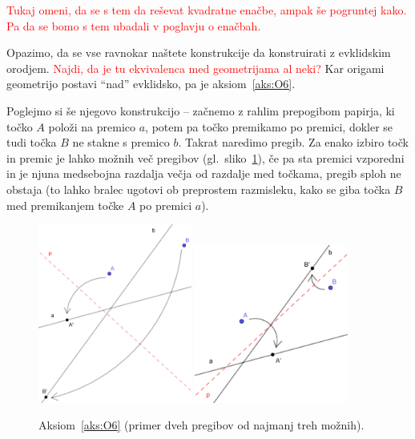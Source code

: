 \textcolor{red}{Tukaj omeni, da se s tem da reševat kvadratne enačbe, ampak še pogruntej kako. Pa da se bomo s tem ubadali v poglavju o enačbah.}

Opazimo, da se vse ravnokar naštete konstrukcije da konstruirati z evklidskim orodjem. \textcolor{red}{Najdi, da je tu ekvivalenca med geometrijama al neki?} Kar origami geometrijo postavi ``nad'' evklidsko, pa je aksiom~\ref{aks:O6}.

Poglejmo si še njegovo konstrukcijo -- začnemo z rahlim prepogibom papirja, ki točko $A$ položi na premico $a$, potem pa točko premikamo po premici, dokler se tudi točka $B$ ne stakne s premico $b$. Takrat naredimo pregib. Za enako izbiro točk in premic je lahko možnih več pregibov (gl.\ sliko~\ref{fig:O6}), če pa sta premici vzporedni in je njuna medsebojna razdalja večja od razdalje med točkama, pregib sploh ne obstaja (to lahko bralec ugotovi ob preprostem razmisleku, kako se giba točka $B$ med premikanjem točke $A$ po premici $a$).

\begin{figure}[h!]
    \centering
    \includegraphics[width=0.45\textwidth]{images/origami_aksiomi/O6b.png}
    \includegraphics[width=0.45\textwidth]{images/origami_aksiomi/O6a.png}
    \caption[Aksiom~\ref{aks:O6}]{Aksiom~\ref{aks:O6} (primer dveh pregibov od najmanj treh možnih).}
    \label{fig:O6}
\end{figure}

